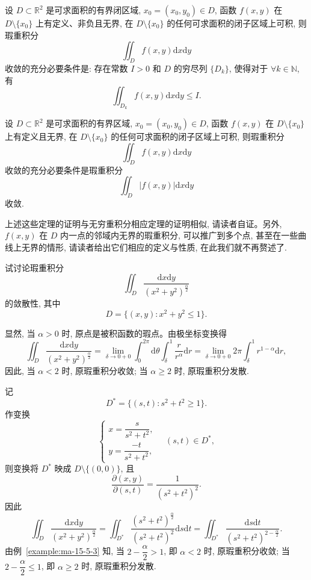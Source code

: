 \begin{theorem}\label{theorem:ma-15-5-7}
设 $D\subset\mathbb R^2$ 是可求面积的有界闭区域, $x_0=(x_0,y_0)\in D$, 函数 $f(x,y)$ 在 $D\setminus\{x_0\}$ 上有定义、非负且无界, 在 $D\setminus\{x_0\}$ 的任何可求面积的闭子区域上可积, 则瑕重积分
\[
  \iint_D f(x,y)\mathrm dx\mathrm dy
\]
收敛的充分必要条件是: 存在常数 $I>0$ 和 $D$ 的穷尽列 $\{D_k\}$, 使得对于 $\forall k\in\mathbb N$, 有
\[
  \iint_{D_k}f(x,y)\mathrm dx\mathrm dy\leqslant I.
\]
\end{theorem}


\begin{theorem}\label{theorem:ma-15-5-8}
设 $D\subset\mathbb R^2$ 是可求面积的有界区域, $x_0=(x_0,y_0)\in D$, 函数 $f(x,y)$ 在 $D\setminus\{x_0\}$ 上有定义且无界, 在 $D\setminus\{x_0\}$ 的任何可求面积的闭子区域上可积, 则瑕重积分
\[
  \iint_D f(x,y)\mathrm dx\mathrm dy
\]
收敛的充分必要条件是瑕重积分
\[
  \iint_D |f(x,y)|\mathrm dx\mathrm dy
\]
收敛.
\end{theorem}

上述这些定理的证明与无穷重积分相应定理的证明相似, 请读者自证。另外, $f(x,y)$ 在 $D$ 内一点的邻域内无界的瑕重积分, 可以推广到多个点, 甚至在一些曲线上无界的情形, 请读者给出它们相应的定义与性质, 在此我们就不再赘述了.

\begin{example}\label{example:ma-15-5-6}
试讨论瑕重积分
\[
  \iint_D\frac{\mathrm dx\mathrm dy}{(x^2+y^2)^{\frac\alpha2}}
\]
的敛散性, 其中
\[
  D=\{(x,y):x^2+y^2\leqslant1\}.
\]
\end{example}


\begin{solve}[{解法 1}]
显然, 当 $\alpha>0$ 时, 原点是被积函数的瑕点。由极坐标变换得
\[
  \iint_D\frac{\mathrm dx\mathrm dy}{(x^2+y^2)^{\frac\alpha2}}
  =\lim_{\delta\to0+0}\int_0^{2\pi}\mathrm d\theta\int_\delta^1\frac r{r^\alpha}\mathrm dr
  =\lim_{\delta\to0+0}2\pi\int_\delta^1r^{1-\alpha}\mathrm dr,
\]
因此, 当 $\alpha<2$ 时, 原瑕重积分收敛; 当 $\alpha\geqslant2$ 时, 原瑕重积分发散.
\end{solve}


\begin{solve}[{解法 2}]
记
\[
  D^*=\{(s,t):s^2+t^2\geqslant1\}.
\]
作变换
\[
  \begin{cases}
    x=\dfrac{s}{s^2+t^2},\\
    y=\dfrac{-t}{s^2+t^2},
  \end{cases}
  \quad(s,t)\in D^*,
\]
则变换将 $D^*$ 映成 $D\setminus\{(0,0)\}$, 且
\[
  \frac{\partial(x,y)}{\partial(s,t)}=\frac1{(s^2+t^2)^2}.
\]
因此
\[
  \iint_D\frac{\mathrm dx\mathrm dy}{(x^2+y^2)^{\frac\alpha2}}
  =\iint_{D^*}\frac{(s^2+t^2)^{\frac\alpha2}}{(s^2+t^2)^2}\mathrm ds\mathrm dt
  =\iint_{D^*}\frac{\mathrm ds\mathrm dt}{(s^2+t^2)^{2-\frac\alpha2}}.
\]
由例~\ref{example:ma-15-5-3} 知, 当 $2-\dfrac\alpha2>1$, 即 $\alpha<2$ 时, 原瑕重积分收敛; 当 $2-\dfrac\alpha2\leqslant1$, 即 $\alpha\geqslant2$ 时, 原瑕重积分发散.
\end{solve}



